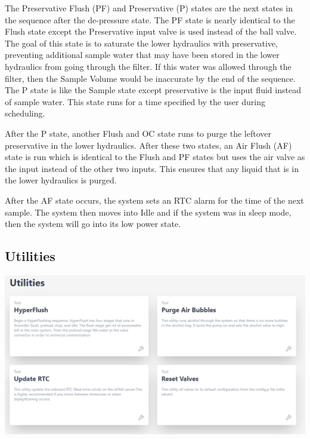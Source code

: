 \documentclass[11pt, letterpaper]{article}
\begin{document}
\newline\par
The Preservative Flush (PF) and Preservative (P) states are the next states in the sequence after the de-pressure state. The PF state is nearly identical to the Flush state except the Preservative input valve is used instead of the ball valve. The goal of this state is to saturate the lower hydraulics with preservative, preventing additional sample water that may have been stored in the lower hydraulics from going through the filter. If this water was allowed through the filter, then the Sample Volume would be inaccurate by the end of the sequence. The P state is like the Sample state except preservative is the input fluid instead of sample water. This state runs for a time specified by the user during scheduling.  
\newline\par
After the P state, another Flush and OC state runs to purge the leftover preservative in the lower hydraulics. After these two states, an Air Flush (AF) state is run which is identical to the Flush and PF states but uses the air valve as the input instead of the other two inputs. This ensures that any liquid that is in the lower hydraulics is purged. 
\newline\par
After the AF state occurs, the system sets an RTC alarm for the time of the next sample. The system then moves into Idle and if the system was in sleep mode, then the system will go into its low power state.

\subsection{Utilities}

\begin{center}
	\includegraphics[scale=0.5]{./Assets/Utilities.png}
\end{center}
\end{document}
